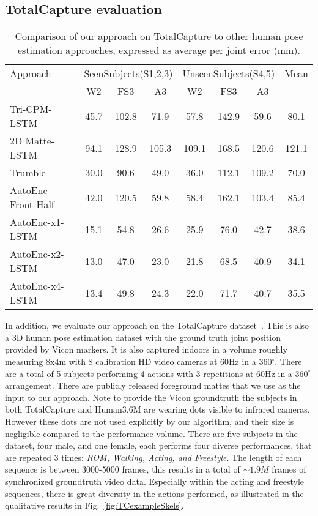 \documentclass[runningheads]{llncs}
\begin{document}
\subsection{TotalCapture evaluation}
\begin{table}[htb]
\centering
{
\small
\begin{tabular}{lccccccc}
\hline
Approach &\multicolumn{3}{c}{SeenSubjects(S1,2,3)}&\multicolumn{3}{c}{UnseenSubjects(S4,5)} & Mean \\
                                        & W2 & FS3 & A3 & W2 & FS3 & A3 & \\ \hline
Tri-CPM-LSTM~\cite{cao2016realtimeCPM}       & 45.7 &102.8 & 71.9& 57.8 & 142.9 & 59.6 & 80.1 \\ 
2D Matte-LSTM~\cite{TrumbleCVMP2DConvNet}& 94.1 &128.9  &105.3 & 109.1& 168.5&120.6&121.1 \\ 
Trumble~\cite{trumble_total_2017} & 30.0 & 90.6 & 49.0 & 36.0 & 112.1 & 109.2 & 70.0 \\ \hline
AutoEnc-Front-Half                   & 42.0 & 120.5 & 59.8 & 58.4 & 162.1 & 103.4 & 85.4 \\
AutoEnc-x1-LSTM                    & 15.1 & 54.8 & 26.6 & 25.9 & 76.0 & 42.7 & 38.6 \\ 
AutoEnc-x2-LSTM                    & 13.0 & 47.0 & 23.0 & 21.8 & 68.5 & 40.9 & 34.1 \\ 
AutoEnc-x4-LSTM                    & 13.4 & 49.8 & 24.3 & 22.0 & 71.7 & 40.7 & 35.5 \\ \hline
\end{tabular}
}
\caption{Comparison of our approach on  TotalCapture  to other human pose estimation approaches, expressed as average per joint error (mm).}
\label{tab:totalcaptureResults}
\squeezeup
\squeezeup
\end{table}
In addition, we evaluate our approach on the TotalCapture dataset~\cite{trumble_total_2017}. This is also a 3D human pose estimation dataset with the ground truth joint position provided by Vicon markers. It is also captured indoors in a volume roughly measuring 8x4m with 8 calibration HD video cameras at 60Hz in a 360$^{\circ}$. There are a total of 5 subjects performing 4 actions with 3 repetitions at 60Hz in a $360^\circ$ arrangement. There are publicly released foreground mattes that we use as the input to our approach. Note to provide the Vicon groundtruth the subjects in both TotalCapture and Human3.6M are wearing dots visible to infrared cameras. However these dots are not used explicitly by our algorithm, and their size is negligible compared to the performance volume. There are five subjects in the dataset, four male, and one female, each performs four diverse performances, that are repeated 3 times: \emph{ROM, Walking, Acting, and Freestyle}. The length of each sequence is between 3000-5000 frames, this results in a total of $\sim 1.9M$ frames of synchronized groundtruth video data. Especially within the acting and freestyle sequences, there is great diversity in the actions performed, as illustrated in the qualitative results in Fig.~\ref{fig:TCexampleSkels}. 
\end{document}
